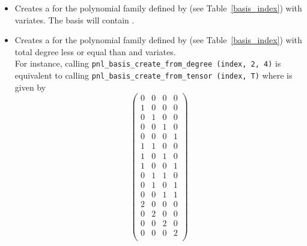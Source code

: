\begin{itemize}
  \item {}
    \sshortdescribe Creates a  for the polynomial family
    defined by  (see Table~\ref{basis_index}) with 
    variates. The basis will contain . 

  \item {}
    \sshortdescribe Creates a  for the polynomial family
    defined by  (see Table~\ref{basis_index}) with total degree less
    or equal than  and  variates.\\
    For instance, calling \verb!pnl_basis_create_from_degree (index, 2, 4)! is
    equivalent to calling \verb!pnl_basis_create_from_tensor (index, T)! where
     is given by
    \[ \left(
    \begin{array}{cccc}
      0 & 0 & 0 & 0\\
      1 & 0 & 0 & 0\\
      0 & 1 & 0 & 0\\
      0 & 0 & 1 & 0\\
      0 & 0 & 0 & 1\\
      1 & 1 & 0 & 0\\
      1 & 0 & 1 & 0\\
      1 & 0 & 0 & 1\\
      0 & 1 & 1 & 0\\
      0 & 1 & 0 & 1\\
      0 & 0 & 1 & 1\\
      2 & 0 & 0 & 0\\
      0 & 2 & 0 & 0\\
      0 & 0 & 2 & 0\\
      0 & 0 & 0 & 2\\
    \end{array}
    \right) \]



\end{itemize}
